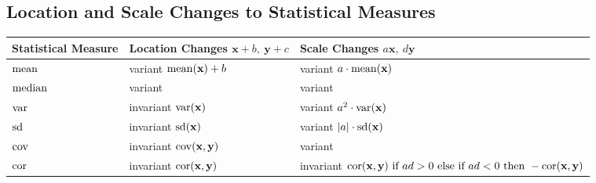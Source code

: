 \documentclass[../../dsa1101_notes.Rtex]{subfiles}\usepackage[]{graphicx}\usepackage[]{color}
\begin{document}
\subsection{Location and Scale Changes to Statistical Measures}
\begin{center}
\begin{tabular}{ |p{3cm}|p{6cm}| P{6cm} | }
\hline
\textbf{Statistical Measure} & \textbf{Location Changes} \(\textbf{x} + b,\ \textbf{y} + c\) & \textbf{Scale Changes} \(a\textbf{x},\ d\textbf{y}\) \\
\hline
\(\operatorname{mean}\) & variant \(\operatorname{mean}(\textbf{x}) + b\) & variant \(a \cdot \operatorname{mean}(\textbf{x})\) \\
\hline
\(\operatorname{median}\) & variant & variant \\
\hline
\(\operatorname{var}\) & invariant \(\operatorname{var}(\textbf{x})\) & variant \(a^2 \cdot \operatorname{var}(\textbf{x})\) \\
\hline
\(\operatorname{sd}\) & invariant \(\operatorname{sd}(\textbf{x})\) & variant \(\lvert a\rvert \cdot \operatorname{sd}(\textbf{x})\) \\
\hline
\(\operatorname{cov}\) & invariant \(\operatorname{cov}(\textbf{x}, \textbf{y})\) & variant \\
\hline
\(\operatorname{cor}\) & invariant \(\operatorname{cor}(\textbf{x}, \textbf{y})\) & invariant \(\operatorname{cor}(\textbf{x}, \textbf{y}) \text{ if } ad > 0 \text{ else if } ad < 0 \text{ then } -\operatorname{cor}(\textbf{x}, \textbf{y})\) \\
\hline
\end{tabular}
\end{center}
\end{document}
